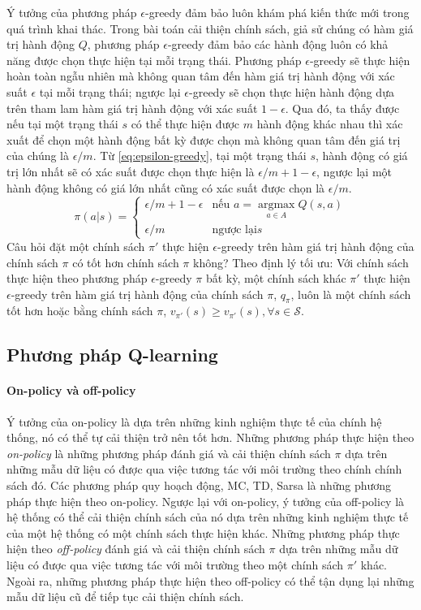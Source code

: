 Ý tưởng của phương pháp $\epsilon$-greedy đảm bảo luôn khám phá kiến thức mới trong quá trình khai thác. Trong bài toán cải thiện chính sách, giả sử chúng có hàm giá trị hành động $Q$, phương pháp $\epsilon$-greedy đảm bảo các hành động luôn có khả năng được chọn thực hiện tại mỗi trạng thái. Phương pháp $\epsilon$-greedy sẽ thực hiện hoàn toàn ngẫu nhiên mà không quan tâm đến hàm giá trị hành động với xác suất $\epsilon$ tại mỗi trạng thái; ngược lại $\epsilon$-greedy sẽ chọn thực hiện hành động dựa trên tham lam hàm giá trị hành động với xác suất $1 - \epsilon$. Qua đó, ta thấy được nếu tại một trạng thái $s$ có thể thực hiện được $m$ hành động khác nhau thì xác xuất để chọn một hành động bất kỳ được chọn mà không quan tâm đến giá trị của chúng là $\epsilon/m$. Từ \ref{eq:epsilon-greedy}, tại một trạng thái $s$, hành động có giá trị lớn nhất sẽ có xác suất được chọn thực hiện là $\epsilon/m + 1 - \epsilon$, ngược lại một hành động không có giá lớn nhất cũng có xác suất được chọn là $\epsilon/m$. 
\begin{equation}
\pi(a|s) =
\left\{\begin{matrix}
\epsilon/m + 1 - \epsilon & \text{nếu }a = \underset{a \in A}{\operatorname{argmax}}Q(s,a)\\ 
\epsilon/m & \text{ngược lại}s
\end{matrix}\right.
\label{eq:epsilon-greedy}
\end{equation}
Câu hỏi đặt một chính sách $\pi'$ thực hiện $\epsilon$-greedy trên hàm giá trị hành động của  chính sách $\pi$ có tốt hơn chính sách $\pi$ không? Theo định lý tối ưu: Với chính sách thực hiện theo phương pháp $\epsilon$-greedy $\pi$ bất kỳ, một chính sách khác $\pi'$ thực hiện $\epsilon$-greedy trên hàm giá trị hành động của chính sách $\pi$, $q_{\pi}$, luôn là một chính sách tốt hơn hoặc bằng chính sách $\pi$, $v_{\pi'}(s) \geq v_{\pi'}(s), \forall s \in \mathcal{S}$.

\subsection{Phương pháp Q-learning}
\paragraph*{On-policy và off-policy}
Ý tưởng của on-policy là dựa trên những kinh nghiệm thực tế của chính hệ thống, nó có thể tự cải thiện trở nên tốt hơn. Những phương pháp thực hiện theo \textit{on-policy} là những phương pháp đánh giá và cải thiện chính sách $\pi$ dựa trên những mẫu dữ liệu có được qua việc tương tác với môi trường theo chính chính sách đó. Các phương pháp quy hoạch động, MC, TD, Sarsa là những phương pháp thực hiện theo on-policy.
Ngược lại với on-policy, ý tưởng của off-policy là hệ thống có thể cải thiện chính sách của nó dựa trên những kinh nghiệm thực tế của một hệ thống có một chính sách thực hiện khác. Những phương pháp thực hiện theo \textit{off-policy} đánh giá và cải thiện chính sách $\pi$ dựa trên những mẫu dữ liệu có được qua việc tương tác với môi trường theo một chính sách $\pi'$ khác. Ngoài ra, những phương pháp thực hiện theo off-policy có thể tận dụng lại những mẫu dữ liệu cũ để tiếp tục cải thiện chính sách.

